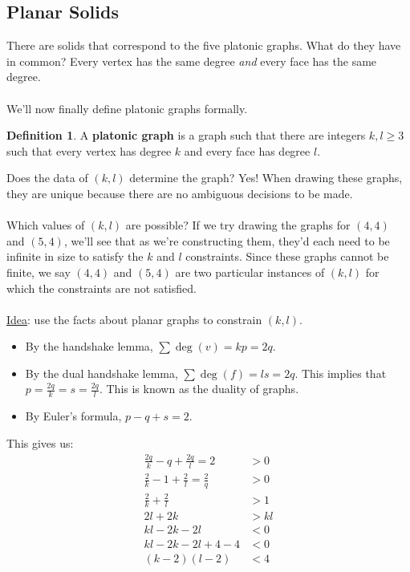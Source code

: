 \documentclass[]{article}
\theoremstyle{definition}
\newtheorem*{defn}{Definition}
\begin{document}
		\subsection{Planar Solids}
			There are solids that correspond to the five platonic graphs. What do they have in common? Every vertex has the same degree \emph{and} every face has the same degree.
			\\ \\
			We'll now finally define platonic graphs formally.
			\begin{defn}
				A \textbf{platonic graph} is a graph such that there are integers $k, l \ge 3$ such that every vertex has degree $k$ and every face has degree $l$.
			\end{defn}

			Does the data of $(k, l)$ determine the graph? Yes! When drawing these graphs, they are unique because there are no ambiguous decisions to be made.
			\\ \\
			Which values of $(k, l)$ are possible? If we try drawing the graphs for $(4,4)$ and $(5,4)$, we'll see that as we're constructing them, they'd each need to be infinite in size to satisfy the $k$ and $l$ constraints. Since these graphs cannot be finite, we say $(4,4)$ and $(5,4)$ are two particular instances of $(k, l)$ for which the constraints are not satisfied.
			\\ \\
			\underline{Idea}: use the facts about planar graphs to constrain $(k, l)$.

			\begin{itemize}
				\item By the handshake lemma, $\sum \deg(v) = kp = 2q$.
				\item By the dual handshake lemma, $\sum \deg(f) = ls = 2q$. This implies that $p = \frac{2q}{k} = s = \frac{2q}{l}$. This is known as the duality of graphs.
				\item By Euler's formula, $p - q + s = 2$.
			\end{itemize}

			This gives us:
			\begin{align*}
				\frac{2q}{k} - q + \frac{2q}{l} = 2 &> 0 \\
				\frac{2}{k} - 1 + \frac{2}{l} = \frac{2}{q} &> 0 \\
				\frac{2}{k} + \frac{2}{l} &> 1 \\
				2l + 2k &> kl \\
				kl - 2k - 2l &< 0 \\
				kl - 2k - 2l + 4 - 4 &< 0 \\
				(k-2)(l-2) &< 4
			\end{align*}
\end{document}
